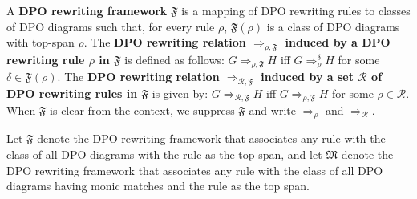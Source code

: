 \begin{definition}
    A \textbf{DPO rewriting framework} $\mathfrak{F}$ is a mapping of DPO rewriting rules to classes of DPO diagrams such that, for every rule $\rho$, $\mathfrak{F}(\rho)$ is a class of DPO diagrams with top-span $\rho$.
    The \textbf{DPO rewriting relation $\Rightarrow_{\rho,\mathfrak{F}}$ induced by a DPO rewriting rule $\rho$ in $\mathfrak{F}$} is defined as follows: $G \Rightarrow_{\rho,\mathfrak{F}} H$ iff $G \Rightarrow_\rho^\delta H$ for some $\delta \in \mathfrak{F}(\rho)$. 
     The \textbf{DPO rewriting relation $\Rightarrow_{\mathcal{R},\mathfrak{F}}$ induced by a set $\mathcal{R}$ of DPO rewriting rules in $\mathfrak{F}$} is given by: $G \Rightarrow_{\mathcal{R},\mathfrak{F}} H$ iff $G \Rightarrow_{\rho,\mathfrak{F}} H$ for some $\rho \in \mathcal{R}$. When $\mathfrak{F}$ is clear from the context, we 
    suppress $\mathfrak{F}$ and 
    write $\Rightarrow_{\rho}$ and $\Rightarrow_{\mathcal{R}}$.
  \end{definition}
Let \(\mathfrak{F}\) denote the DPO rewriting framework that associates any rule with the class of all DPO diagrams with the rule as the top span, and let \(\mathfrak{M}\) denote the DPO rewriting framework that associates any rule with the class of all DPO diagrams having monic matches and the rule as the top span.
